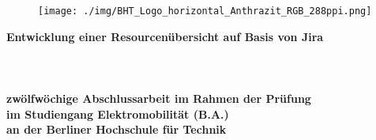  \thispagestyle{empty}
\begin{titlepage}
	 \thispagestyle{empty}
\begin{center}
	 \thispagestyle{empty}
\begin{figure}[t]
	\centering
	\texttt{[image: ./img/BHT\_Logo\_horizontal\_Anthrazit\_RGB\_288ppi.png]}
	
\end{figure}

$~~$\\
\textbf{\huge Entwicklung einer Resourcenübersicht auf Basis von Jira}\paragraph{}$~~$\\
\paragraph{}$~~$\\
\paragraph{}$~~$\\
\textbf{zwölfwöchige Abschlussarbeit im Rahmen der Prüfung}\\ \textbf{im Studiengang Elektromobilität (B.A.)}\\ \textbf{an der Berliner Hochschule für Technik}
\paragraph{}$~~$\\
\paragraph{}$~~$\\
\paragraph{}$~~$\\
\\
\\
\\
\\
\\
\paragraph{}$~~$\\
\\
\end{center}	
\end{titlepage}

